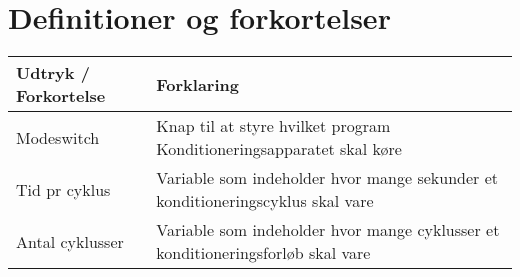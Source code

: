 	\section{Definitioner og forkortelser}
	\begin{longtable}{ |p{} |p{}| } 
		\hline
		\textbf{Udtryk / Forkortelse} &  \textbf{Forklaring} \\
		\hline
		Modeswitch & Knap til at styre hvilket program Konditioneringsapparatet skal køre \\
		\hline
		Tid pr cyklus & Variable som indeholder hvor mange sekunder et konditioneringscyklus skal vare \\
		\hline
		Antal cyklusser & Variable som indeholder hvor mange cyklusser et konditioneringsforløb skal vare \\
		\hline
	\end{longtable}